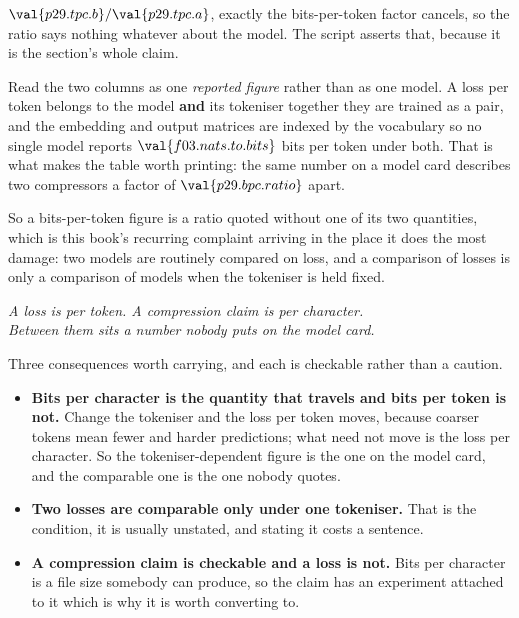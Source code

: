 \begin{fr}

$\val{p29.tpc.b} / \val{p29.tpc.a}$, exactly \dash{} the bits-per-token
factor cancels, so the ratio says nothing whatever about the model. The script
asserts that, because it is the section's whole claim.

\begin{note}
Read the two columns as one \emph{reported figure} rather than as one model. A
loss per token belongs to the model \textbf{and} its tokeniser together
\dash{} they are trained as a pair, and the embedding and output matrices are
indexed by the vocabulary \dash{} so no single model reports
$\val{f03.nats.to.bits}$ bits per token under both. That is what makes the
table worth printing: the same number on a model card describes two
compressors a factor of $\val{p29.bpc.ratio}$ apart.
\end{note}

So a bits-per-token figure is a ratio quoted without one of its two
quantities, which is this book's recurring complaint arriving in the place it
does the most damage: two models are routinely compared on loss, and a
comparison of losses is only a comparison of models when the tokeniser is
held fixed.

\begin{center}
\emph{A loss is per token. A compression claim is per character.\\
Between them sits a number nobody puts on the model card.}
\end{center}

Three consequences worth carrying, and each is checkable rather than a
caution.

\begin{itemize}
\item \textbf{Bits per character is the quantity that travels and bits per
  token is not.} Change the tokeniser and the loss per token moves, because
  coarser tokens mean fewer and harder predictions; what need not move is the
  loss per character. So the tokeniser-dependent figure is the one on the
  model card, and the comparable one is the one nobody quotes.
\item \textbf{Two losses are comparable only under one tokeniser.} That is
  the condition, it is usually unstated, and stating it costs a sentence.
\item \textbf{A compression claim is checkable and a loss is not.} Bits per
  character is a file size somebody can produce, so the claim has an
  experiment attached to it \dash{} which is why it is worth converting to.
\end{itemize}

\end{fr}


